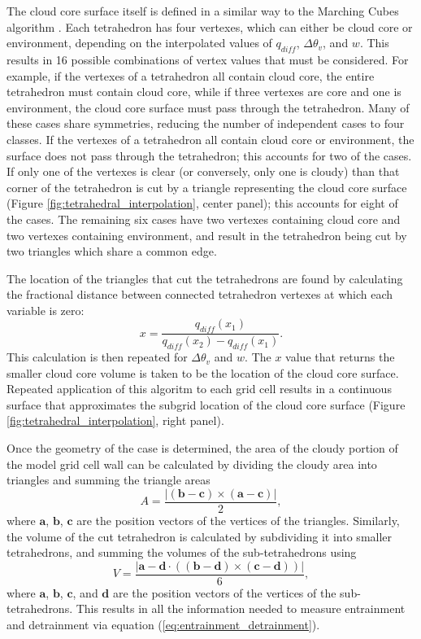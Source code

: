 \documentclass[12pt]{article}
\begin{document}
The cloud core surface itself is defined in a similar way to the Marching 
Cubes algorithm \citep{Lorensen1987}.  Each tetrahedron has four vertexes, 
which can either be cloud core or environment, depending on the interpolated 
values of $q_{diff}$, $\Delta \theta_v$, and $w$.  This results in 16 
possible combinations of vertex values that must be considered.  For example,
if the vertexes of a tetrahedron all contain cloud core, the entire 
tetrahedron must contain cloud core, while if three vertexes are core and one 
is environment, the cloud core surface must pass through the tetrahedron.
Many of these cases share symmetries, reducing the number of independent cases 
to four classes.  If the vertexes of a tetrahedron all contain cloud core or 
environment, the surface does not pass through the tetrahedron; this accounts 
for two of the cases.  If only one of the vertexes is clear (or conversely, 
only one is cloudy) than that corner of the tetrahedron is cut by a triangle 
representing the cloud core surface (Figure 
\ref{fig:tetrahedral_interpolation}, center panel); this accounts for eight of
the cases.  The remaining six cases have two vertexes containing cloud core 
and two vertexes containing environment, and result in the tetrahedron being 
cut by two triangles which share a common edge.

The location of the triangles that cut the tetrahedrons are found by 
calculating the fractional distance between connected tetrahedron vertexes at 
which each variable is zero:
\begin{equation}
\label{eq:q_diff_interpolation}
x = \frac{q_{diff}(x_1)}{q_{diff}(x_2) - q_{diff}(x_1)}.
\end{equation}
This calculation is then repeated for $\Delta\theta_v$ and $w$.  The $x$ value 
that returns the smaller cloud core volume is taken to be the location of the 
cloud core surface.   Repeated application of this algoritm to each grid cell 
results in a continuous surface that approximates the subgrid location of the 
cloud core surface (Figure \ref{fig:tetrahedral_interpolation}, right panel).

Once the geometry of the case is determined, the area of the cloudy portion of
the model grid cell wall can be calculated by dividing the cloudy area into 
triangles and summing the triangle areas
\begin{equation}
A = \frac{|(\mathbf{b - c}) \times (\mathbf{a - c})|}{2},
\end{equation}
where $\mathbf{a}$, $\mathbf{b}$, $\mathbf{c}$ are the position vectors of the 
vertices of the triangles.  Similarly, the volume of the cut tetrahedron is 
calculated by subdividing it into smaller tetrahedrons, and summing the volumes 
of the sub-tetrahedrons using
\begin{equation}
V = \frac{|\mathbf{a - d} \cdot ((\mathbf{b - d}) \times (\mathbf{c - d}))|}{6},
\end{equation}
where $\mathbf{a}$, $\mathbf{b}$, $\mathbf{c}$, and $\mathbf{d}$ are the 
position vectors of the vertices of the sub-tetrahedrons.  This results in 
all the information needed to measure entrainment and detrainment via equation
(\ref{eq:entrainment_detrainment}).
\end{document}
